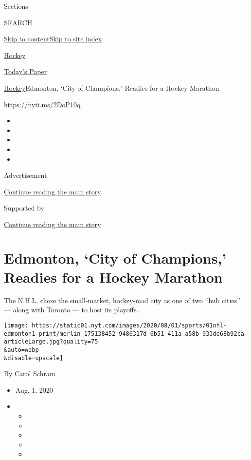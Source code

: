 Sections

SEARCH

\protect\hyperlink{site-content}{Skip to
content}\protect\hyperlink{site-index}{Skip to site index}

\href{https://www.nytimes.com/section/sports/hockey}{Hockey}

\href{https://myaccount.nytimes.com/auth/login?response_type=cookie\&client_id=vi}{}

\href{https://www.nytimes.com/section/todayspaper}{Today's Paper}

\href{/section/sports/hockey}{Hockey}\textbar{}Edmonton, `City of
Champions,' Readies for a Hockey Marathon

\url{https://nyti.ms/2DoP10q}

\begin{itemize}
\item
\item
\item
\item
\item
\end{itemize}

Advertisement

\protect\hyperlink{after-top}{Continue reading the main story}

Supported by

\protect\hyperlink{after-sponsor}{Continue reading the main story}

\hypertarget{edmonton-city-of-champions-readies-for-a-hockey-marathon}{%
\section{Edmonton, `City of Champions,' Readies for a Hockey
Marathon}\label{edmonton-city-of-champions-readies-for-a-hockey-marathon}}

The N.H.L. chose the small-market, hockey-mad city as one of two ``hub
cities'' --- along with Toronto --- to host its playoffs.

\texttt{[image: https://static01.nyt.com/images/2020/08/01/sports/01nhl-edmonton1-print/merlin\_175138452\_9486317d-6b51-411a-a58b-933de68b92ca-articleLarge.jpg?quality=75\\\&auto=webp\\\&disable=upscale]}

By Carol Schram

\begin{itemize}
\item
  Aug. 1, 2020
\item
  \begin{itemize}
  \item
  \item
  \item
  \item
  \item
  \end{itemize}
\end{itemize}

